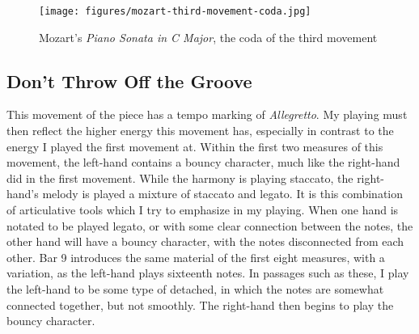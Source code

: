 \begin{figure}
    \centering
    \texttt{[image: figures/mozart-third-movement-coda.jpg]}
    \caption{Mozart's \textit{Piano Sonata in C Major}, the coda of the third movement}
    \label{fig:mozart-third-movement-coda}
\end{figure}

\subsection{Don't Throw Off the Groove}

This movement of the piece has a tempo marking of \textit{Allegretto}. My playing must then reflect the higher energy this movement has, especially in contrast to the energy I played the first movement at. Within the first two measures of this movement, the left-hand contains a bouncy character, much like the right-hand did in the first movement. While the harmony is playing staccato, the right-hand's melody is played a mixture of staccato and legato. It is this combination of articulative tools which I try to emphasize in my playing. When one hand is notated to be played legato, or with some clear connection between the notes, the other hand will have a bouncy character, with the notes disconnected from each other. Bar 9 introduces the same material of the first eight measures, with a variation, as the left-hand plays sixteenth notes. In passages such as these, I play the left-hand to be some type of detached, in which the notes are somewhat connected together, but not smoothly. The right-hand then begins to play the bouncy character. %